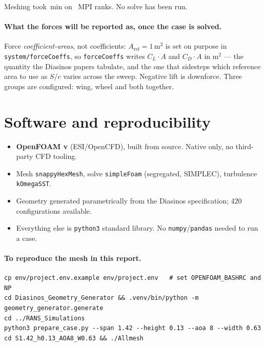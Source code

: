 \documentclass[11pt,a4paper]{article}
\providecommand{\si}[1]{\ensuremath{\mathrm{#1}}}
\providecommand{\SI}[2]{\ensuremath{#1\,\mathrm{#2}}}
\begin{document}
\noindent
Meshing took \meshMinutes\,min on \npRanks\ MPI ranks. No solve has been run.

\paragraph{What the forces will be reported as, once the case is solved.}
Force \emph{coefficient-areas}, not coefficients:
$A_{\mathrm{ref}} = \SI{1}{m^2}$ is set on purpose in
\texttt{system/forceCoeffs}, so \texttt{forceCoeffs} writes
$C_L\!\cdot\!A$ and $C_D\!\cdot\!A$ in \si{m^2} --- the quantity the Diasinos
papers tabulate, and the one that sidesteps which reference area to use as
$S/c$ varies across the sweep. Negative lift is downforce. Three groups are
configured: wing, wheel and both together.

\section{Software and reproducibility}

\begin{itemize}
\item \textbf{OpenFOAM v\ofApi} (ESI/OpenCFD), built from source. Native
  only, no third-party CFD tooling.
\item Mesh \texttt{snappyHexMesh}, solve \texttt{simpleFoam} (segregated,
  SIMPLEC), turbulence \texttt{kOmegaSST}.
\item Geometry generated parametrically from the Diasinos specification;
  420 configurations available.
\item Everything else is \texttt{python3} standard library. No
  \texttt{numpy}/\texttt{pandas} needed to run a case.
\end{itemize}

\paragraph{To reproduce the mesh in this report.}
\begin{verbatim}
cp env/project.env.example env/project.env   # set OPENFOAM_BASHRC and NP
cd Diasinos_Geometry_Generator && .venv/bin/python -m geometry_generator.generate
cd ../RANS_Simulations
python3 prepare_case.py --span 1.42 --height 0.13 --aoa 8 --width 0.63
cd S1.42_h0.13_AOA8_W0.63 && ./Allmesh
\end{verbatim}

\end{document}
